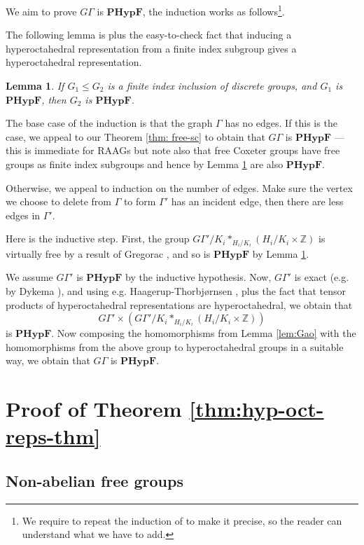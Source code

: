 \documentclass[12pt]{article}
\newtheorem{lemma}[theorem]{Lemma}
\newcommand{\Z}{\mathbb{Z}}
\newcommand{\1}{\mathds{1}}
\newcommand{\PHF}{\mathbf{PHypF}}
\begin{document}
 We aim to prove $G\Gamma$ is $\PHF$, the induction works as follows\footnote{We require to repeat the induction of \cite{gao2026newsourcepurelyfinite} to make it precise, so the reader can understand what we have to add.}.

The following lemma is \cite[Lemma 7.1]{Lo.Ma2025} plus the easy-to-check fact that inducing a hyperoctahedral representation from a finite index subgroup gives a hyperoctahedral representation.
\begin{lemma}\label{lem:finite_index}If $G_1 \leq G_2$ is a finite index inclusion of discrete groups, and $G_1$ is $\PHF$, then $G_2$ is $\PHF$.
\end{lemma}


The base case of the induction is that the graph $\Gamma$  has no edges. If this is the case, we appeal to our Theorem \ref{thm: free-sc} to obtain that $G\Gamma$ is $\PHF$ --- this is immediate for RAAGs but note also that free Coxeter groups have free groups as finite index subgroups and hence by Lemma \ref{lem:finite_index} are also $\PHF$.

Otherwise, we appeal to induction on the number of edges. Make sure the vertex we choose to delete from $\Gamma$ to form $\Gamma'$ has an incident edge, then there are less edges in $\Gamma'$.

Here is the inductive step.
First, the group $G\Gamma' /K_i \ast_{H_i/K_i}  ( H_i/K_i \times \Z )$ is virtually free by a result of Gregorac \cite{Gregorac}, and so is $\PHF$ by Lemma \ref{lem:finite_index}.

We assume $G\Gamma'$ is $\PHF$ by the inductive hypothesis. Now, $G\Gamma'$  is exact (e.g. by Dykema \cite{Dykema}), and using e.g. Haagerup-Thorbj{\o}rnsen \cite[Thm. 9.1]{HT}, plus the fact that tensor products of hyperoctahedral representations are hyperoctahedral, we obtain that 
\[
 G\Gamma' \times \left( G\Gamma' /K_i \ast_{H_i/K_i}  ( H_i/K_i \times \Z ) \right)
\]
is $\PHF$. Now composing the homomorphisms from Lemma \ref{lem:Gao} with the homomorphisms from the above group to hyperoctahedral groups in a suitable way, we obtain that $G\Gamma$  is $\PHF$.


\section{Proof of Theorem \ref{thm:hyp-oct-reps-thm}}

\subsection{Non-abelian free groups}
\end{document}
